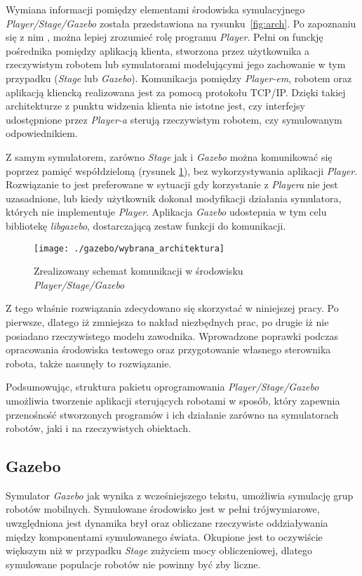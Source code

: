 	Wymiana informacji pomiędzy elementami środowiska symulacyjnego \textit{Player/Stage/Gazebo} została przedstawiona na 
	rysunku~\ref{fig:arch}.
	Po zapoznaniu się z nim , można lepiej zrozumieć rolę programu \textit{Player}. Pełni on funckję pośrednika pomiędzy aplikacją klienta, stworzona przez użytkownika
	a rzeczywistym robotem lub symulatorami modelującymi jego zachowanie w tym przypadku (\textit{Stage} lub \textit{Gazebo}). 
	Komunikacja pomiędzy \textit{Player-em}, robotem oraz aplikacją kliencką realizowana jest za pomocą protokołu TCP/IP.
	Dzięki takiej architekturze z punktu widzenia klienta nie istotne jest, czy interfejsy udostępnione przez \textit{Player-a} sterują rzeczywistym robotem, czy symulowanym odpowiednikiem.
	
	Z samym symulatorem, zarówno \textit{Stage} jak i \textit{Gazebo} można komunikować się poprzez pamięć współdzieloną (rysunek \ref{fig:wybrana_arch}), bez wykorzystywania aplikacji \textit{Player}. Rozwiązanie to jest 
	preferowane w sytuacji gdy korzystanie z \textit{Playera} nie jest uzasadnione, lub kiedy użytkownik dokonał modyfikacji działania symulatora, których nie implementuje \textit{Player}. 
	Aplikacja \textit{Gazebo} udostepnia w tym celu  bibliotekę \textit{libgazebo}, dostarczającą zestaw funkcji do komunikacji.
	\begin{figure}[h]
	\centering
	\texttt{[image: ./gazebo/wybrana\_architektura]}
	\caption{Zrealizowany schemat komunikacji w środowisku \textit{Player/Stage/Gazebo} \label{fig:wybrana_arch}}
	\end{figure}
	Z tego właśnie rozwiązania zdecydowano się skorzystać w niniejszej pracy. Po pierwsze, dlatego iż zmniejsza to nakład niezbędnych prac, po drugie iż nie posiadano rzeczywistego modelu
	zawodnika. Wprowadzone poprawki podczas opracowania środowiska testowego oraz przygotowanie własnego sterownika robota, także nasunęły to rozwiązanie.

	Podsumowując, struktura pakietu oprogramowania \mbox{\textit{Player/Stage/Gazebo}} umożliwia tworzenie aplikacji sterujących robotami w sposób,
	który zapewnia przenośność stworzonych programów i ich działanie zarówno na symulatorach robotów, jaki i na rzeczywistych obiektach.
	
 	\subsection{Gazebo}
 	
 	Symulator \textit{Gazebo} jak wynika z wcześniejszego tekstu, umożliwia symulację grup robotów mobilnych. Symulowane
 	środowisko jest w pełni trójwymiarowe, uwzględniona jest dynamika brył oraz obliczane rzeczywiste oddziaływania między komponentami symulowanego świata.
	Okupione jest to oczywiście większym niż w przypadku \textit{Stage} zużyciem mocy obliczeniowej, dlatego symulowane populacje robotów nie powinny być zby liczne.
 	 	
